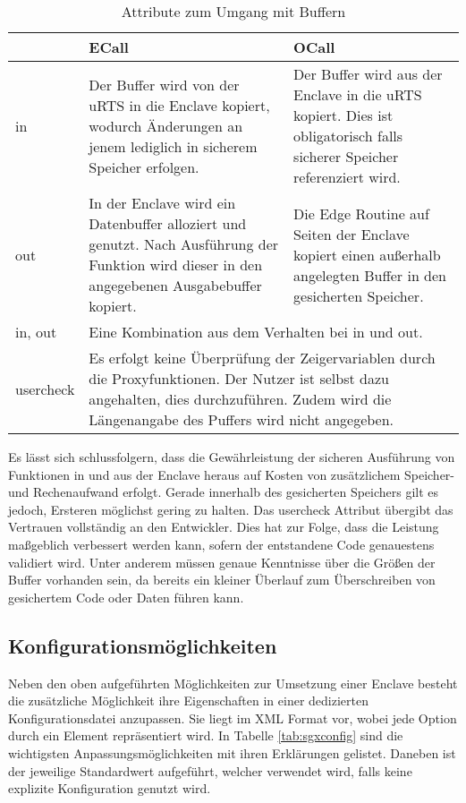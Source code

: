 \begin{table}[h]
	\centering
	\caption{Attribute zum Umgang mit Buffern}
	\begin{tabularx}{\textwidth}{|l|X|X|}
		\hline
		& \textbf{\ac{ECall}} & \textbf{\ac{OCall}} \\
		\hline
		in & Der Buffer wird von der \ac{uRTS} in die Enclave kopiert, wodurch Änderungen an jenem lediglich in sicherem Speicher erfolgen. & Der Buffer wird aus der Enclave in die \ac{uRTS} kopiert. Dies ist obligatorisch falls sicherer Speicher referenziert wird. \\
		\hline
		out & In der Enclave wird ein Datenbuffer alloziert und genutzt. Nach Ausführung der Funktion wird dieser in den angegebenen Ausgabebuffer kopiert. & Die Edge Routine auf Seiten der Enclave kopiert einen außerhalb angelegten Buffer in den gesicherten Speicher. \\
		\hline
		in, out & \multicolumn{2}{l|}{Eine Kombination aus dem Verhalten bei in und out.} \\
		\hline
		user\textunderscore check & \multicolumn{2}{p{0.8\textwidth}|}{Es erfolgt keine Überprüfung der Zeigervariablen durch die Proxyfunktionen. Der Nutzer ist selbst dazu angehalten, dies durchzuführen. Zudem wird die Längenangabe des Puffers wird nicht angegeben.} \\
		\hline
	\end{tabularx}
	\label{tab:sgxbuffer}
\end{table}

Es lässt sich schlussfolgern, dass die Gewährleistung der sicheren Ausführung von Funktionen in und aus der Enclave heraus auf Kosten von zusätzlichem Speicher- und Rechenaufwand erfolgt. Gerade innerhalb des gesicherten Speichers gilt es jedoch, Ersteren möglichst gering zu halten. Das user\textunderscore check Attribut übergibt das Vertrauen vollständig an den Entwickler. Dies hat zur Folge, dass die Leistung maßgeblich verbessert werden kann, sofern der entstandene Code genauestens validiert wird. Unter anderem müssen genaue Kenntnisse über die Größen der Buffer vorhanden sein, da bereits ein kleiner Überlauf zum Überschreiben von gesichertem Code oder Daten führen kann.

\subsection{Konfigurationsmöglichkeiten}

Neben den oben aufgeführten Möglichkeiten zur Umsetzung einer Enclave besteht die zusätzliche Möglichkeit ihre Eigenschaften in einer dedizierten Konfigurationsdatei anzupassen. Sie liegt im \ac{XML} Format vor, wobei jede Option durch ein Element repräsentiert wird. In Tabelle \ref{tab:sgxconfig} sind die wichtigsten Anpassungsmöglichkeiten mit ihren Erklärungen gelistet. Daneben ist der jeweilige Standardwert aufgeführt, welcher verwendet wird, falls keine explizite Konfiguration genutzt wird.

